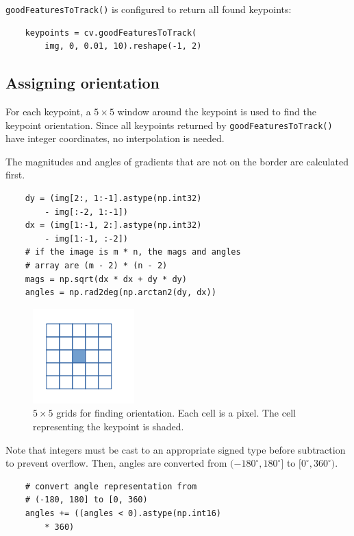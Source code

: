 \documentclass{ee208report}
\begin{document}
\begin{multicols*}{2}
\texttt{goodFeaturesToTrack()} is configured to return all found keypoints:

\begin{verbatim}
    keypoints = cv.goodFeaturesToTrack(
        img, 0, 0.01, 10).reshape(-1, 2)
\end{verbatim}

\subsection{Assigning orientation}

For each keypoint, a $5 \times 5$ window around the keypoint is used to find the
keypoint orientation. Since all keypoints returned by
\texttt{goodFeaturesToTrack()} have integer coordinates, no interpolation is
needed.

The magnitudes and angles of gradients that are not on the border are calculated
first.

\begin{verbatim}
    dy = (img[2:, 1:-1].astype(np.int32)
        - img[:-2, 1:-1])
    dx = (img[1:-1, 2:].astype(np.int32)
        - img[1:-1, :-2])
    # if the image is m * n, the mags and angles
    # array are (m - 2) * (n - 2)
    mags = np.sqrt(dx * dx + dy * dy)
    angles = np.rad2deg(np.arctan2(dy, dx))
\end{verbatim}

\begin{figure}[H]
    \centering
    \includegraphics{images/keypoint_window.png}
    \caption{$5 \times 5$ grids for finding orientation. Each cell is a pixel.
        The cell representing the keypoint is shaded.}
    \label{fig:keypoint-window}
\end{figure}

Note that integers must be cast to an appropriate signed type before subtraction
to prevent overflow. Then, angles are converted from
$(-180^\circ, 180^\circ]$ to $[0^\circ, 360^\circ)$.

\begin{verbatim}
    # convert angle representation from
    # (-180, 180] to [0, 360)
    angles += ((angles < 0).astype(np.int16)
        * 360)
\end{verbatim}


\end{multicols*}
\end{document}
